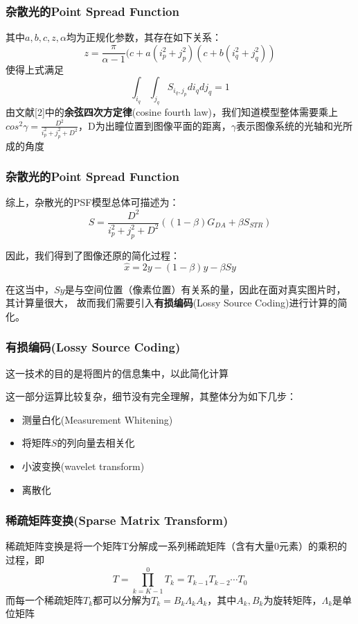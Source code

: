 \documentclass{beamer}
\begin{document}
\begin{frame}
\frametitle{杂散光的Point Spread Function}
其中$a,b,c,z,\alpha$均为正规化参数，其存在如下关系：
\begin{equation}
z=\frac{\pi}{\alpha-1}(c+a(i_p^2+j_p^2)(c+b(i_q^2+j_q^2))
\end{equation}
使得上式满足
\begin{equation}
\int_{i_q}\int_{j_q}S_{i_q,j_p}di_qdj_q=1
\end{equation}\pause
由文献[2]中的\textbf{余弦四次方定律}(cosine fourth law)，我们知道模型整体需要乘上$cos^2\gamma=\frac{D^2}{i_p^2+j_p^2+D^2}$，D为出瞳位置到图像平面的距离，$\gamma$表示图像系统的光轴和光所成的角度\\
\end{frame}
\begin{frame}
\frametitle{杂散光的Point Spread Function}
综上，杂散光的PSF模型总体可描述为：
\begin{equation}
S=\frac{D^2}{i_p^2+j_p^2+D^2}((1-\beta)G_{DA}+\beta S_{STR})
\end{equation}\pause

因此，我们得到了图像还原的简化过程：
\begin{equation}
\hat{x}=2y-(1-\beta)y-\beta Sy
\end{equation}\pause

在这当中，$Sy$是与空间位置（像素位置）有关系的量，因此在面对真实图片时，其计算量很大， 故而我们需要引入\textbf{有损编码}(Lossy  Source Coding)进行计算的简化。
\end{frame}
\begin{frame}
\frametitle{有损编码(Lossy Source Coding)}
这一技术的目的是将图片的信息集中，以此简化计算

这一部分运算比较复杂，\alert{细节没有完全理解}，其整体分为如下几步：\pause

\begin{itemize}
\item 测量白化(Measurement Whitening)
\item 将矩阵$S$的列向量去相关化
\item 小波变换(wavelet transform)
\item 离散化
\end{itemize}
\end{frame}
\begin{frame}
\frametitle{稀疏矩阵变换(Sparse Matrix Transform)}
稀疏矩阵变换是将一个矩阵T分解成一系列稀疏矩阵（含有大量0元素）的乘积的过程，即
\begin{equation}
T=\prod_{k=K-1}^{0}T_k=T_{k-1}T_{k-2}\cdots T_0
\end{equation}\pause
而每一个稀疏矩阵$T_k$都可以分解为$T_k=B_k\Lambda _k A_k$，其中$A_k,B_k$为旋转矩阵，$\Lambda _k$是单位矩阵
\end{frame}
\end{document}

